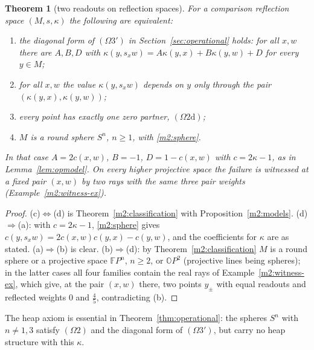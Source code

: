 \documentclass[11pt,reqno]{amsart}
\newtheorem{theorem}{Theorem}[section]
\theoremstyle{definition}
\theoremstyle{remark}
\numberwithin{equation}{section}
\begin{document}
\begin{theorem}[two readouts on reflection spaces]\label{m2:two-readout}
For a comparison reflection space $(M,s,\kappa)$ the following are equivalent:
\begin{enumerate}[label=(\alph*)]
\item the diagonal form of $(\Omega3')$ in Section~\ref{sec:operational} holds: for all $x,w$ there are $A,B,D$ with
$\kappa(y,s_xw)=A\kappa(y,x)+B\kappa(y,w)+D$ for every $y\in M$;
\item for all $x,w$ the value $\kappa(y,s_xw)$ depends on $y$ only through the pair $(\kappa(y,x),\kappa(y,w))$;
\item every point has exactly one zero partner, $(\Omega2\mathrm d)$;
\item $M$ is a round sphere $S^n$, $n\ge1$, with \eqref{m2:sphere}.
\end{enumerate}
In that case $A=2c(x,w)$, $B=-1$, $D=1-c(x,w)$ with $c=2\kappa-1$, as in Lemma~\ref{lem:opmodel}.  On every higher projective space the
failure is witnessed at a fixed pair $(x,w)$ by two rays with the same three pair weights (Example~\ref{m2:witness-ex}).
\end{theorem}

\begin{proof}
(c)$\Leftrightarrow$(d) is Theorem~\ref{m2:classification} with Proposition~\ref{m2:models}.  (d)$\Rightarrow$(a): with $c=2\kappa-1$,
\eqref{m2:sphere} gives $c(y,s_xw)=2c(x,w)c(y,x)-c(y,w)$, and the coefficients for $\kappa$ are as stated.  (a)$\Rightarrow$(b) is clear.
(b)$\Rightarrow$(d): by Theorem~\ref{m2:classification} $M$ is a round sphere or a projective space $\mathbb FP^n$, $n\ge2$, or
$\mathbb OP^2$ (projective lines being spheres); in the latter cases all four families contain the real rays of
Example~\ref{m2:witness-ex}, which give, at the pair $(x,w)$ there, two points $y_\pm$ with equal readouts and reflected weights $0$ and
$\tfrac45$, contradicting (b).
\end{proof}

\noindent The heap axiom is essential in Theorem~\ref{thm:operational}: the spheres $S^n$ with $n\ne1,3$ satisfy $(\Omega2)$ and the
diagonal form of $(\Omega3')$, but carry no heap structure with this $\kappa$.
\end{document}
